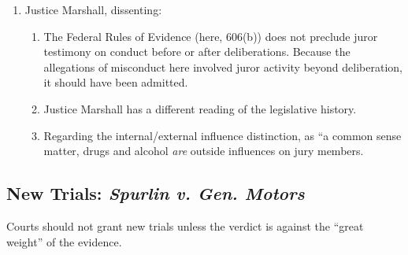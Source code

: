 \begin{enumerate}
\begin{enumerate}
    \end{enumerate}
    \item Justice Marshall, dissenting:
    \begin{enumerate}
        \item The Federal Rules of Evidence (here, 606(b)) does not preclude 
        juror testimony on conduct before or after deliberations. Because the 
        allegations of misconduct here involved juror activity beyond 
        deliberation, it should have been admitted.
        \item Justice Marshall has a different reading of the legislative 
        history.
        \item Regarding the internal/external influence distinction, as ``a 
        common sense matter, drugs and alcohol \emph{are} outside influences 
        on jury members.
    \end{enumerate}
\end{enumerate}

\subsection{New Trials: \emph{Spurlin v. Gen. Motors}}

Courts should not grant new trials unless the verdict is against the ``great 
weight'' of the evidence.

